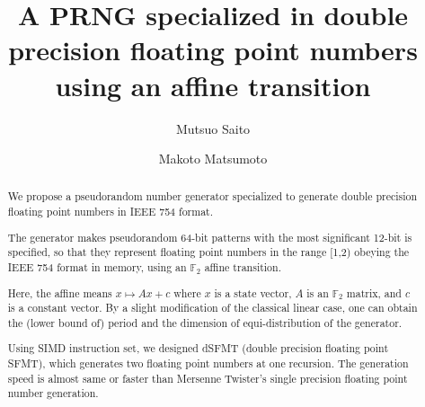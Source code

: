 \documentclass{svmult}
\def\bbf2{\ifmmode \mathbb{F}_2 \else $\mathbb{F}_2$ \fi}
\begin{document}
\newcommand{\mmod}{\textrm{mod}\,}

\title*{A PRNG specialized in double precision floating point numbers
  using an affine transition}


\author{Mutsuo Saito\and
Makoto Matsumoto}
%

\maketitle
            
\begin{abstract} 
  We propose a pseudorandom number generator specialized to
  generate double precision floating point numbers in IEEE 754 format.

  The generator makes pseudorandom 64-bit patterns with the most
  significant 12-bit is specified, so that they represent floating
  point numbers in the range [1,2) obeying the IEEE 754 format in
  memory, using an $\mathbb{F}_2$ affine transition.

  Here, the affine means $x \mapsto Ax+c$ where
  $x$ is a state vector, $A$ is an $\mathbb{F}_2$
  matrix, and $c$ is a constant vector. 
  By a slight modification of the classical linear case,
  one can obtain the (lower bound of) period and the dimension of
  equi-distribution of the generator.

  Using SIMD instruction set, we designed dSFMT (double precision floating
  point SFMT), which generates two floating point numbers at one recursion.
  The generation speed is almost same or faster than Mersenne Twister's
  single precision floating point number generation.
\end{abstract}
\end{document}
